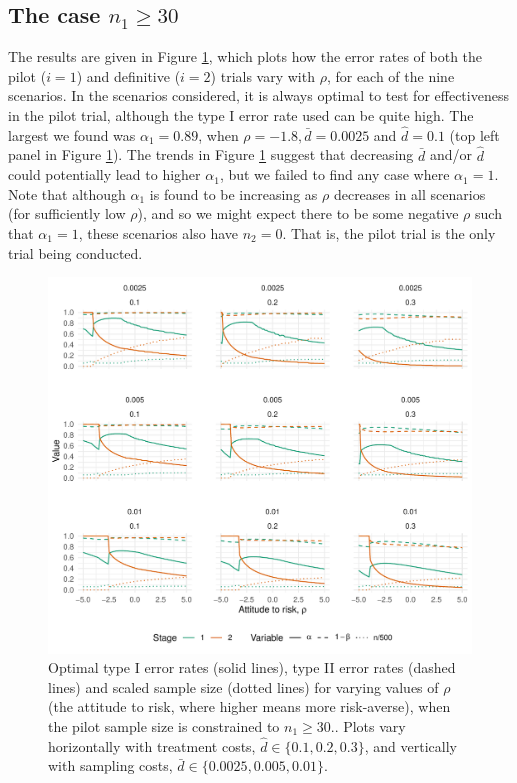\documentclass[sagev, Crown]{sagej} %
\begin{document}
\subsection{The case $n_1 \geq 30$}

The results are given in Figure \ref{fig:eval}, which plots how the error rates of both the pilot ($i = 1$) and definitive ($i = 2$) trials vary with $\rho$, for each of the nine scenarios. In the scenarios considered, it is always optimal to test for effectiveness in the pilot trial, although the type I error rate used can be quite high. The largest we found was $\alpha_1 = 0.89$, when $\rho = -1.8, \bar{d} = 0.0025$ and $\hat{d} = 0.1$ (top left panel in Figure \ref{fig:eval}). The trends in Figure \ref{fig:eval} suggest that decreasing $\bar{d}$ and/or $\hat{d}$ could potentially lead to higher $\alpha_1$, but we failed to find any case where $\alpha_1 = 1$. Note that although $\alpha_1$ is found to be increasing as $\rho$ decreases in all scenarios (for sufficiently low $\rho$), and so we might expect there to be some negative $\rho$ such that $\alpha_1 = 1$, these scenarios also have $n_2 = 0$. That is, the pilot trial is the only trial being conducted.

\begin{figure}
\centering
\includegraphics[scale=0.8]{./Figures/eval_np30.pdf}
\caption{Optimal type I error rates (solid lines), type II error rates (dashed lines) and scaled sample size (dotted lines) for varying values of $\rho$ (the attitude to risk, where higher means more risk-averse), when the pilot sample size is constrained to $n_1 \geq 30$.. Plots vary horizontally with treatment costs, $\hat{d} \in \{0.1, 0.2, 0.3\}$, and vertically with sampling costs, $\bar{d} \in \{0.0025, 0.005, 0.01\}$.}
\label{fig:eval}
\end{figure}
\end{document}
